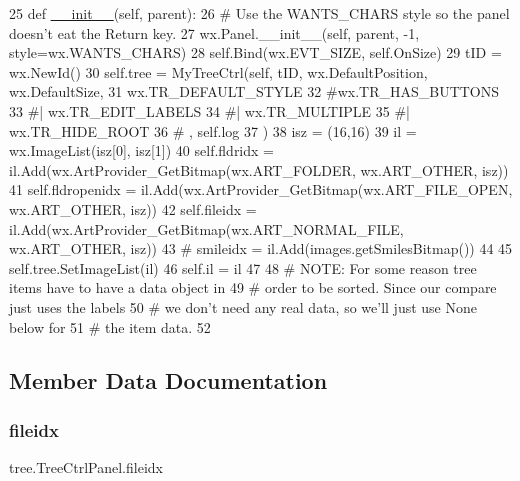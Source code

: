 \begin{DoxyCode}
25     \textcolor{keyword}{def }\hyperlink{classwrapper_1_1ModuleDictWrapper_a9a7a794150502f51df687831583e13b9}{\_\_init\_\_}(self, parent):
26         \textcolor{comment}{# Use the WANTS\_CHARS style so the panel doesn't eat the Return key.}
27         wx.Panel.\_\_init\_\_(self, parent, -1, style=wx.WANTS\_CHARS)
28         self.Bind(wx.EVT\_SIZE, self.OnSize)
29         tID = wx.NewId()
30         self.tree = MyTreeCtrl(self, tID, wx.DefaultPosition, wx.DefaultSize,
31                                wx.TR\_DEFAULT\_STYLE
32                                \textcolor{comment}{#wx.TR\_HAS\_BUTTONS}
33                                \textcolor{comment}{#| wx.TR\_EDIT\_LABELS}
34                                \textcolor{comment}{#| wx.TR\_MULTIPLE}
35                                \textcolor{comment}{#| wx.TR\_HIDE\_ROOT}
36 \textcolor{comment}{#                               , self.log}
37                                )
38         isz = (16,16)
39         il = wx.ImageList(isz[0], isz[1])
40         self.fldridx     = il.Add(wx.ArtProvider\_GetBitmap(wx.ART\_FOLDER,      wx.ART\_OTHER, isz))
41         self.fldropenidx = il.Add(wx.ArtProvider\_GetBitmap(wx.ART\_FILE\_OPEN,   wx.ART\_OTHER, isz))
42         self.fileidx     = il.Add(wx.ArtProvider\_GetBitmap(wx.ART\_NORMAL\_FILE, wx.ART\_OTHER, isz))
43 \textcolor{comment}{#        smileidx    = il.Add(images.getSmilesBitmap())}
44 
45         self.tree.SetImageList(il)
46         self.il = il
47 
48         \textcolor{comment}{# NOTE:  For some reason tree items have to have a data object in}
49         \textcolor{comment}{#        order to be sorted.  Since our compare just uses the labels}
50         \textcolor{comment}{#        we don't need any real data, so we'll just use None below for}
51         \textcolor{comment}{#        the item data.}
52 
\end{DoxyCode}


\subsection{Member Data Documentation}
\mbox{\label{classtree_1_1TreeCtrlPanel_a329afaebcd954a826bf2105603847b52}} 
\subsubsection{\texorpdfstring{fileidx}{fileidx}}
{\footnotesize\ttfamily tree.\+Tree\+Ctrl\+Panel.\+fileidx}



